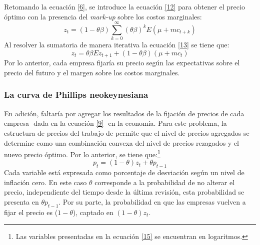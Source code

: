 Retomando la ecuación \eqref{6}, se introduce la ecuación \eqref{12} para obtener   el precio óptimo con la presencia del  \textit{mark-up} sobre los costos marginales:
\begin{equation}\label{13}
z_{t}=(1-\theta\beta)\sum_{k=0}^{\infty}(\theta\beta)^{k}E(\mu +mc_{t+k})
\end{equation}
Al resolver la sumatoria de manera iterativa la ecuación \eqref{13} se tiene que: 
\begin{equation}\label{14}
z_{t}=\theta\beta Ez_{t+1}+(1-\theta\beta)(\mu +mc_{t}) 
\end{equation}
Por lo anterior, cada empresa fijaría su precio según las expectativas sobre el precio del futuro y el margen sobre los costos marginales.

\subsubsection*{La curva de Phillips neokeynesiana}
En adición, faltaría por agregar los resultados de la fijación de precios de cada empresa -dada en la ecuación \eqref{9}-  en la economía. Para este problema, la estructura de precios del trabajo de \cite{calvo1983staggered} permite que el nivel de precios agregados se determine como una combinación convexa del nivel de precios rezagados y el nuevo precio óptimo. Por lo anterior, se tiene que:\footnote{Las variables presentadas en la ecuación  \eqref{15} se encuentran en logaritmos.} 
\begin{equation}\label{15}
p_{t}=(1-\theta)z_{t}+\theta p_{t-1}
\end{equation}
Cada variable está expresada como porcentaje de desviación según un nivel de inflación cero. En este caso $\theta$ corresponde a la probabilidad de no alterar el precio, independiente del tiempo desde la última revisión, esta probabilidad se presenta en $\theta p_{t-1}$. Por su parte, la probabilidad en que las empresas vuelven a fijar el precio es ($1-\theta$), captado en  $(1-\theta)z_{t}$.\\

